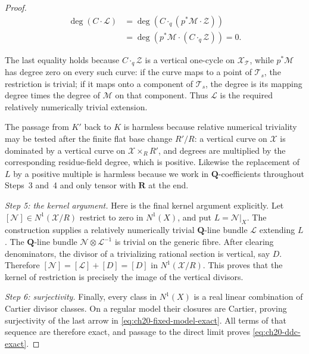 \begin{proof}
\begin{equation}
\label{eq:ch20-kunnemann-projection}
 \begin{aligned}
  \deg(C\cdot\mathcal L)
   &=\deg\!\left(C\mathbin{\cdot_q}
          (p^*\mathcal M\cdot\mathcal Z)\right)\\
   &=\deg\!\left(p^*\mathcal M\cdot
          (C\mathbin{\cdot_q}\mathcal Z)\right)=0.
 \end{aligned}
\end{equation}

The last equality holds because \(C\mathbin{\cdot_q}\mathcal Z\) is a
vertical one-cycle on \(\mathcal X_{\mathcal T}\), while
\(p^*\mathcal M\) has degree zero on every such curve: if the curve maps to
a point of \(\mathcal T_s\), the restriction is trivial; if it maps onto a
component of \(\mathcal T_s\), the degree is its mapping degree times the
degree of \(\mathcal M\) on that component.  Thus \(\mathcal L\) is the
required relatively numerically trivial extension.

The passage from \(K'\) back to \(K\) is harmless because relative
numerical triviality may be tested after the finite flat base change
\(R'/R\): a vertical curve on \(\mathcal X\) is dominated by a vertical
curve on \(\mathcal X\times_RR'\), and degrees are multiplied by the
corresponding residue-field degree, which is positive.  Likewise the
replacement of \(L\) by a positive multiple is harmless because we work in
\(\mathbf Q\)-coefficients throughout Steps~3 and~4 and only tensor with
\(\mathbf R\) at the end.

\emph{Step 5: the kernel argument.}
Here is the final kernel argument explicitly.  Let
\([\mathcal N]\in N^1(\mathcal X/R)\) restrict to zero in \(N^1(X)\), and
put \(L=\mathcal N|_X\).  The construction supplies a relatively
numerically trivial \(\mathbf Q\)-line bundle \(\mathcal L\) extending
\(L\).  The \(\mathbf Q\)-line bundle
\(\mathcal N\otimes\mathcal L^{-1}\) is trivial on the generic fibre.
After clearing denominators, the divisor of a trivializing rational section
is vertical, say \(D\).  Therefore
\([\mathcal N]=[\mathcal L]+[D]=[D]\) in \(N^1(\mathcal X/R)\).  This proves
that the kernel of restriction is precisely the image of the vertical
divisors.

\emph{Step 6: surjectivity.}
Finally, every class in \(N^1(X)\) is a real linear combination of Cartier
divisor classes.  On a regular model their closures are Cartier, proving
surjectivity of the last arrow in
\eqref{eq:ch20-fixed-model-exact}.  All terms of that sequence are therefore
exact, and passage to the direct limit proves
\eqref{eq:ch20-ddc-exact}.
\end{proof}

